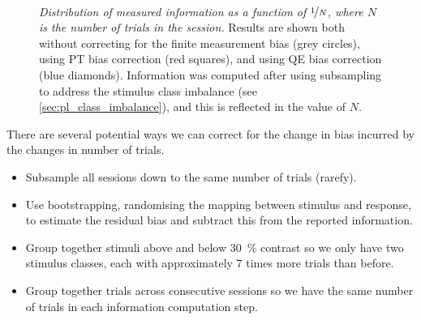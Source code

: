 \begin{figure}[htbp]
    \centering
    \hspace*{\fill}
    \hspace*{\fill}\hspace{.2cm}\hspace*{\fill}
    \hspace*{\fill}
    \\
    \hspace*{\fill}
    \hspace*{\fill}\hspace{.2cm}\hspace*{\fill}
    \hspace*{\fill}
    \caption{\textit{Distribution of measured information as a function of $\nicefrac{1}{N}$, where $N$ is the number of trials in the session.}
Results are shown both without correcting for the finite measurement bias (grey circles), using \ac{PT} bias correction (red squares), and using \ac{QE} bias correction (blue diamonds).
Information was computed after using subsampling to address the stimulus class imbalance (see \autoref{sec:pl_class_imbalance}), and this is reflected in the value of $N$.
}
    \label{fig:IvN}
    \label{fig:I_vs_invN}
\end{figure}


There are several potential ways we can correct for the change in bias incurred by the changes in number of trials.
\begin{itemize}
\item Subsample all sessions down to the same number of trials (rarefy).
\item Use bootstrapping, randomising the mapping between stimulus and response, to estimate the residual bias and subtract this from the reported information.
\item Group together stimuli above and below \SI{30}{\percent} contrast so we only have two stimulus classes, each with approximately \num{7} times more trials than before.
\item Group together trials across consecutive sessions so we have the same number of trials in each information computation step.
\end{itemize}

